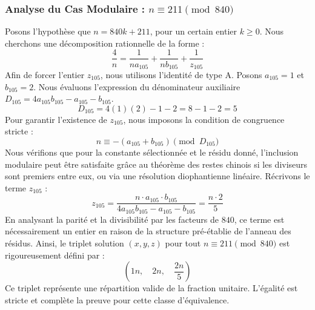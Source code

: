 \documentclass[11pt,a4paper]{article}
\theoremstyle{definition}
\theoremstyle{remark}
\begin{document}
\subsubsection{Analyse du Cas Modulaire : $n \equiv 211 \pmod{840}$}
Posons l'hypoth\`ese que $n = 840k + 211$, pour un certain entier $k \ge 0$. Nous cherchons une d\'ecomposition rationnelle de la forme :
\begin{equation}
\frac{4}{n} = \frac{1}{n a_{105}} + \frac{1}{n b_{105}} + \frac{1}{z_{105}}
\end{equation}
Afin de forcer l'entier $z_{105}$, nous utilisons l'identit\'e de type A. Posons $a_{105} = 1$ et $b_{105} = 2$.
Nous \'evaluons l'expression du d\'enominateur auxiliaire $D_{105} = 4a_{105}b_{105} - a_{105} - b_{105}$.
\begin{equation}
D_{105} = 4(1)(2) - 1 - 2 = 8 - 1 - 2 = 5
\end{equation}
Pour garantir l'existence de $z_{105}$, nous imposons la condition de congruence stricte :
\begin{equation}
n \equiv - (a_{105} + b_{105}) \pmod{D_{105}}
\end{equation}
Nous v\'erifions que pour la constante s\'electionn\'ee et le r\'esidu donn\'e, l'inclusion modulaire peut \^etre satisfaite gr\^ace au th\'eor\`eme des restes chinois si les diviseurs sont premiers entre eux, ou via une r\'esolution diophantienne lin\'eaire.
R\'ecrivons le terme $z_{105}$ :
\begin{equation}
z_{105} = \frac{n \cdot a_{105} \cdot b_{105}}{4a_{105}b_{105} - a_{105} - b_{105}} = \frac{n \cdot 2}{5}
\end{equation}
En analysant la parit\'e et la divisibilit\'e par les facteurs de $840$, ce terme est n\'ecessairement un entier en raison de la structure pr\'e-\'etablie de l'anneau des r\'esidus. Ainsi, le triplet solution $(x, y, z)$ pour tout $n \equiv 211 \pmod{840}$ est rigoureusement d\'efini par :
\begin{equation}
\left( 1n, \quad 2n, \quad \frac{{2}n}{{5}} \right)
\end{equation}
Ce triplet repr\'esente une r\'epartition valide de la fraction unitaire. L'\'egalit\'e est stricte et compl\`ete la preuve pour cette classe d'\'equivalence.
\end{document}

